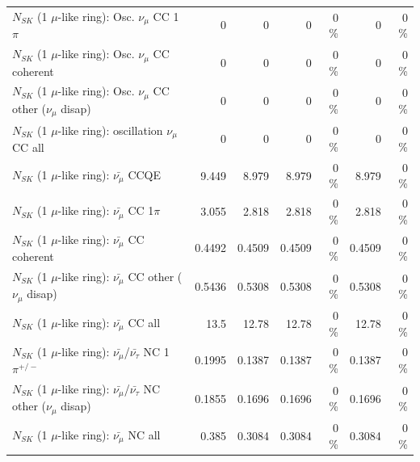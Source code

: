 \begin{table}
\begin{tabular}{| l | r | r | r  r | r  r |}
                          $N_{SK}$ (1 $\mu$-like ring): Osc. $\nu_\mu$ CC 1$\pi$ &               0 &               0 &               0 &        0 \%  &               0 &        0 \%  \\ 
                        $N_{SK}$ (1 $\mu$-like ring): Osc. $\nu_\mu$ CC coherent &               0 &               0 &               0 &        0 \%  &               0 &        0 \%  \\ 
         $N_{SK}$ (1 $\mu$-like ring): Osc. $\nu_\mu$ CC other ($\nu_\mu$ disap) &               0 &               0 &               0 &        0 \%  &               0 &        0 \%  \\ 
                      $N_{SK}$ (1 $\mu$-like ring): oscillation $\nu_\mu$ CC all &               0 &               0 &               0 &        0 \%  &               0 &        0 \%  \\ 
\hline
\hline
                              $N_{SK}$ (1 $\mu$-like ring): $\bar{\nu_\mu}$ CCQE &           9.449 &           8.979 &           8.979 &        0 \%  &           8.979 &        0 \%  \\ 
                         $N_{SK}$ (1 $\mu$-like ring): $\bar{\nu_\mu}$ CC 1$\pi$ &           3.055 &           2.818 &           2.818 &        0 \%  &           2.818 &        0 \%  \\ 
                       $N_{SK}$ (1 $\mu$-like ring): $\bar{\nu_\mu}$ CC coherent &          0.4492 &          0.4509 &          0.4509 &        0 \%  &          0.4509 &        0 \%  \\ 
        $N_{SK}$ (1 $\mu$-like ring): $\bar{\nu_\mu}$ CC other ($\nu_\mu$ disap) &          0.5436 &          0.5308 &          0.5308 &        0 \%  &          0.5308 &        0 \%  \\ 
                          $N_{SK}$ (1 $\mu$-like ring): $\bar{\nu_{\mu}}$ CC all &            13.5 &           12.78 &           12.78 &        0 \%  &           12.78 &        0 \%  \\ 
\hline
  $N_{SK}$ (1 $\mu$-like ring): $\bar{\nu_\mu}$/$\bar{\nu_\tau}$ NC 1$\pi^{+/-}$ &          0.1995 &          0.1387 &          0.1387 &        0 \%  &          0.1387 &        0 \%  \\ 
$N_{SK}$ (1 $\mu$-like ring): $\bar{\nu_\mu}$/$\bar{\nu_\tau}$ NC other ($\nu_\mu$ disap) &          0.1855 &          0.1696 &          0.1696 &        0 \%  &          0.1696 &        0 \%  \\ 
                          $N_{SK}$ (1 $\mu$-like ring): $\bar{\nu_{\mu}}$ NC all &           0.385 &          0.3084 &          0.3084 &        0 \%  &          0.3084 &        0 \%  \\ 

\end{tabular}
\end{table}
